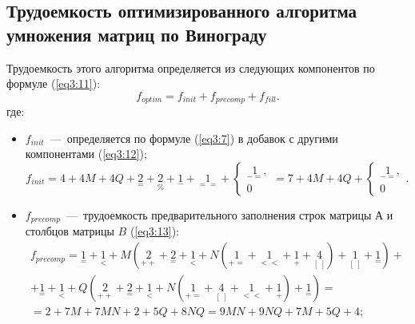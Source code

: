 \subsection{Трудоемкость оптимизированного алгоритма умножения матриц по Винограду}
Трудоемкость этого алгоритма определяется из следующих компонентов по формуле (\ref{eq3:11}):
\begin{equation}
	f_{optim} = f_{init} + f_{precomp} + f_{fill}.
	\label{eq3:11}
\end{equation}
где:
\begin{itemize}
	\item $f_{init}$~---~определяется по формуле (\ref{eq3:7}) в добавок с другими компонентами (\ref{eq3:12});
	\begin{equation}
		f_{init} = 4 + 4M + 4Q + {\underset{=}{2}} + {\underset{\%}{2}} + {\underset{-}{1}} + {\underset{==}{1}} + 
		\begin{cases}
			{\underset{-=}{1}},\\
			0
		\end{cases} = 7 + 4M + 4Q + \begin{cases}
			{\underset{-=}{1}},\\
			0
		\end{cases}.
		\label{eq3:12}
	\end{equation}
	
	\item $f_{precomp}$~---~трудоемкость предварительного заполнения строк матрицы $А$ и столбцов матрицы $B$ (\ref{eq3:13}):
	\begin{multline}
		f_{precomp} = {\underset{=}{1}} + {\underset{<}{1}} + M({\underset{++}{2}} + {\underset{=}{2}} + {\underset{<}{1}} + N({\underset{+=}{1}} + {\underset{<<}{1}} + {\underset{+}{1}} + {\underset{[\ ]}{4}}) + {\underset{[\ ]}{1}} + {\underset{=}{1}}) + \\
		+ {\underset{=}{1}} + {\underset{<}{1}} + Q({\underset{++}{2}} + {\underset{=}{2}} + {\underset{<}{1}} + N({\underset{+=}{1}} + {\underset{[\ ]}{4}} + {\underset{<<}{1}} + {\underset{+}{1}}) + {\underset{=}{1}}) = \\
		= 2 + 7M + 7MN + 2 + 5Q + 8NQ = 9MN + 9NQ + 7M + 5Q + 4;
		\label{eq3:13}
	\end{multline}
	

\end{itemize}
